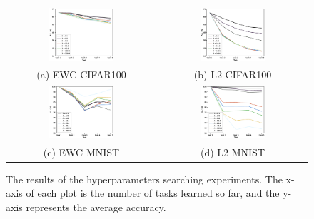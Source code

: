 \documentclass[final]{cvpr}
\begin{document}
\begin{figure}[t]
    \centering
	\begin{tabular}{c@{\hskip0.5cm}c}
		\includegraphics[width=0.45\textwidth]{resources/ewc_CIFAR.eps}&%
        \includegraphics[width=0.45\textwidth]{resources/l2_CIFAR.eps}\\%
        (a) EWC CIFAR100 & (b) L2 CIFAR100\\
        \includegraphics[width=0.45\textwidth]{resources/ewc_MNIST.eps}&%
        \includegraphics[width=0.45\textwidth]{resources/l2_MNIST.eps}\\%
		(c) EWC MNIST  & (d) L2 MNIST \\
	\end{tabular}\vspace{0.2cm}
	\caption{The results of the hyperparameters searching experiments. The x-axis of each plot is the number of tasks learned so far, and the y-axis represents the average accuracy.}
    \label{hyper}
\end{figure}
\end{document}
